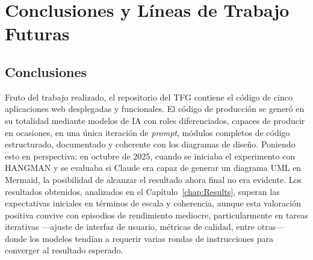
\chapter{Conclusiones y Líneas de Trabajo Futuras} \label{chap:Conclusiones}

\section{Conclusiones} \label{sec:conclusiones}

Fruto del trabajo realizado, el repositorio del \ac{TFG} \cite{URL::TFG} contiene el código de cinco aplicaciones web desplegadas y funcionales.
El código de producción se generó en su totalidad mediante modelos de \ac{IA} con roles diferenciados, capaces de producir en ocasiones, en una única iteración de \textit{prompt}, módulos completos de código estructurado, documentado y coherente con los diagramas de diseño. Poniendo esto en perspectiva: en octubre de 2025, cuando se iniciaba el experimento con \ac{HANGMAN} y se evaluaba si Claude era capaz de generar un diagrama UML en Mermaid, la posibilidad de alcanzar el resultado ahora final no era evidente. 
Los resultados obtenidos, analizados en el Capítulo~\ref{chap:Results}, superan las expectativas iniciales en términos de escala y coherencia, aunque esta valoración positiva convive con episodios de rendimiento mediocre, particularmente en tareas iterativas ---ajuste de interfaz de usuario, métricas de calidad, entre otras--- donde los modelos tendían a requerir varias rondas de instrucciones para converger al resultado esperado.\\

